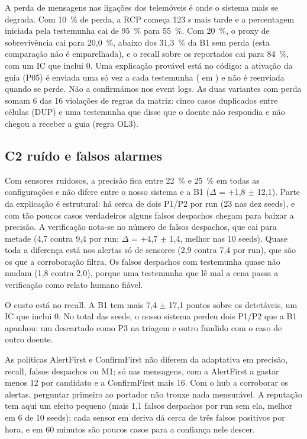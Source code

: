 \documentclass[11pt,a4paper]{article}
\begin{document}
A perda de mensagens nas ligações dos telemóveis é onde o sistema mais se degrada. Com 10~\% de perda, a RCP começa 123 s mais tarde e a percentagem iniciada pela testemunha cai de 95~\% para 55~\%. Com 20~\%, o proxy de sobrevivência cai para 20,0~\%, abaixo dos 31,3~\% da B1 sem perda (esta comparação não é emparelhada), e o recall sobre os reportados cai para 84~\%, com um IC que inclui 0. Uma explicação provável está no código: a ativação da guia (P05) é enviada uma só vez a cada testemunha ( em ) e não é reenviada quando se perde. Não a confirmámos nos event logs. As duas variantes com perda somam 6 das 16 violações de regras da matriz: cinco casos duplicados entre células (DUP) e uma testemunha que disse que o doente não respondia e não chegou a receber a guia (regra OL3).

\subsection{C2 ruído e falsos alarmes}

Com sensores ruidosos, a precisão fica entre 22~\% e 25~\% em todas as configurações e não difere entre o nosso sistema e a B1 ($\Delta$ = +1,8 $\pm$ 12,1). Parte da explicação é estrutural: há cerca de dois P1/P2 por run (23 nas dez seeds), e com tão poucos casos verdadeiros alguns falsos despachos chegam para baixar a precisão. A verificação nota-se no número de falsos despachos, que cai para metade (4,7 contra 9,4 por run; $\Delta$ = +4,7 $\pm$ 1,4, melhor nas 10 seeds). Quase toda a diferença está nos alertas só de sensores (2,9 contra 7,4 por run), que são os que a corroboração filtra. Os falsos despachos com testemunha quase não mudam (1,8 contra 2,0), porque uma testemunha que lê mal a cena passa a verificação como relato humano fiável.

O custo está no recall. A B1 tem mais 7,4 $\pm$ 17,1 pontos sobre os detetáveis, um IC que inclui 0. No total das seeds, o nosso sistema perdeu dois P1/P2 que a B1 apanhou: um descartado como P3 na triagem e outro fundido com o caso de outro doente.

As políticas AlertFirst e ConfirmFirst não diferem da adaptativa em precisão, recall, falsos despachos ou M1; só nas mensagens, com a AlertFirst a gastar menos 12 por candidato e a ConfirmFirst mais 16. Com o hub a corroborar os alertas, perguntar primeiro ao portador não trouxe nada mensurável. A reputação tem aqui um efeito pequeno (mais 1,1 falsos despachos por run sem ela, melhor em 6 de 10 seeds): cada sensor em deriva dá cerca de três falsos positivos por hora, e em 60 minutos são poucos casos para a confiança nele descer.
\end{document}

